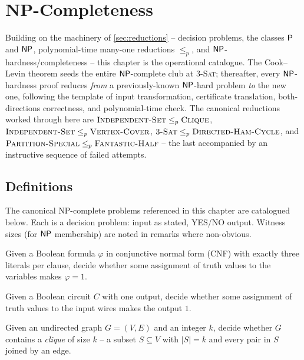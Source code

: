 \section{NP-Completeness}
\label{sec:npc}

Building on the machinery of \cref{sec:reductions} -- decision problems, the classes $\P$ and $\NP$, polynomial-time many-one reductions $\le_p$, and $\NP$-hardness/completeness -- this chapter is the operational catalogue. The Cook--Levin theorem seeds the entire $\NP$-complete club at $3$-\textsc{Sat}; thereafter, every $\NP$-hardness proof reduces \emph{from} a previously-known $\NP$-hard problem \emph{to} the new one, following the template of input transformation, certificate translation, both-directions correctness, and polynomial-time check. The canonical reductions worked through here are $\textsc{Independent-Set} \le_p \textsc{Clique}$, $\textsc{Independent-Set} \le_p \textsc{Vertex-Cover}$, $3\textsc{-Sat} \le_p \textsc{Directed-Ham-Cycle}$, and $\textsc{Partition-Special} \le_p \textsc{Fantastic-Half}$ -- the last accompanied by an instructive sequence of failed attempts.

\subsection{Definitions}
The canonical NP-complete problems referenced in this chapter are catalogued below. Each is a decision problem: input as stated, YES/NO output. Witness sizes (for $\NP$ membership) are noted in remarks where non-obvious.

\begin{definition}[3-SAT]
\label{def:3sat}
Given a Boolean formula $\varphi$ in conjunctive normal form (CNF) with exactly three literals per clause, decide whether some assignment of truth values to the variables makes $\varphi = 1$.
\end{definition}

\begin{definition}
\label{def:circuit_sat}
Given a Boolean circuit $C$ with one output, decide whether some assignment of truth values to the input wires makes the output $1$.
\end{definition}

\begin{definition}[Clique]
\label{def:clique}
Given an undirected graph $G = (V, E)$ and an integer $k$, decide whether $G$ contains a \emph{clique} of size $k$ -- a subset $S \subseteq V$ with $|S| = k$ and every pair in $S$ joined by an edge.
\end{definition}

